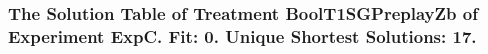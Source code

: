  \begin{frame}
 \fontsize{8pt}{9pt}\selectfont
 \frametitle{ The Solution Table of Treatment BoolT1SGPreplayZb of Experiment ExpC. Fit: 0. Unique Shortest Solutions: 17. }

 \label{ExpCSolutionTable003.tex}  
 \end{frame}

